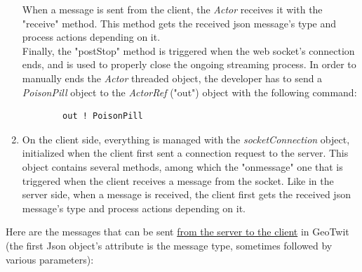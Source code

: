 \documentclass[a4paper,11pt]{report}
\begin{document}
\begin{enumerate}
	When a message is sent from the client, the \emph{Actor} receives it with the "receive" method. This method gets the received json message's type and process actions depending on it.\\
	Finally, the "postStop" method is triggered when the web socket's connection ends, and is used to properly close the ongoing streaming process. In order to manually ends the \emph{Actor} threaded object, the developer has to send a \emph{PoisonPill} object to the \emph{ActorRef} ("out") object with the following command:
	\begin{lstlisting}
		out ! PoisonPill
	\end{lstlisting}

	\item On the client side, everything is managed with the \emph{socketConnection} object, initialized when the client first sent a connection request to the server. This object contains several methods, among which the "onmessage" one that is triggered when the client receives a message from the socket. Like in the server side, when a message is received, the client first gets the received json message's type and process actions depending on it.
\end{enumerate}
\bigskip
Here are the messages that can be sent \underline{from the server to the client} in GeoTwit (the first Json object's attribute is the message type, sometimes followed by various parameters):
\end{document}
